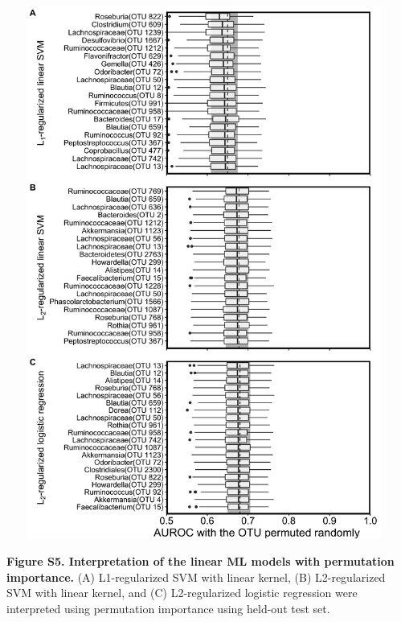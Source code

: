 \documentclass[11pt,]{article}
\begin{document}
\newpage

\includegraphics[height=17.5cm, width=13cm]{Figure_S5.png}

\textbf{Figure S5. Interpretation of the linear ML models with
permutation importance.} (A) L1-regularized SVM with linear kernel, (B)
L2-regularized SVM with linear kernel, and (C) L2-regularized logistic
regression were interpreted using permutation importance using held-out
test set.

\newpage
\end{document}
